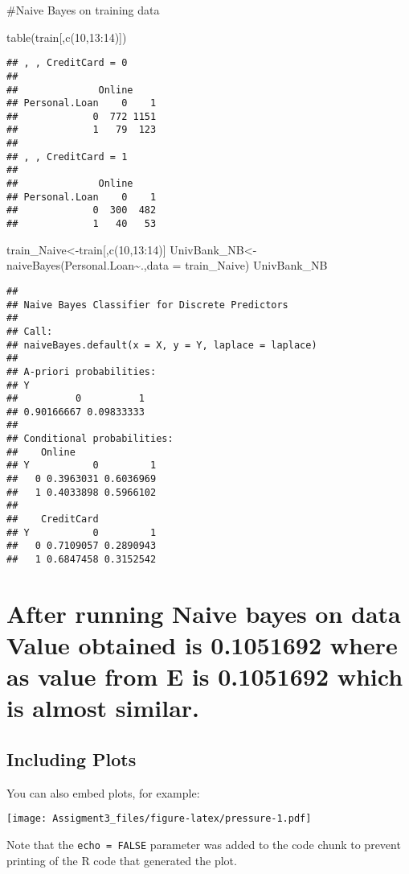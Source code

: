 \documentclass[
]{article}
\newenvironment{Shaded}{\begin{snugshade}}{\end{snugshade}}
\newcommand{\AttributeTok}[1]{\textcolor[rgb]{0.77,0.63,0.00}{#1}}
\newcommand{\DecValTok}[1]{\textcolor[rgb]{0.00,0.00,0.81}{#1}}
\newcommand{\FunctionTok}[1]{\textcolor[rgb]{0.00,0.00,0.00}{#1}}
\newcommand{\NormalTok}[1]{#1}
\newcommand{\OtherTok}[1]{\textcolor[rgb]{0.56,0.35,0.01}{#1}}
\newcommand{\SpecialCharTok}[1]{\textcolor[rgb]{0.00,0.00,0.00}{#1}}
\begin{document}
\#Naive Bayes on training data

\begin{Shaded}
\begin{Highlighting}[]
\FunctionTok{table}\NormalTok{(train[,}\FunctionTok{c}\NormalTok{(}\DecValTok{10}\NormalTok{,}\DecValTok{13}\SpecialCharTok{:}\DecValTok{14}\NormalTok{)])}
\end{Highlighting}
\end{Shaded}

\begin{verbatim}
## , , CreditCard = 0
## 
##              Online
## Personal.Loan    0    1
##             0  772 1151
##             1   79  123
## 
## , , CreditCard = 1
## 
##              Online
## Personal.Loan    0    1
##             0  300  482
##             1   40   53
\end{verbatim}

\begin{Shaded}
\begin{Highlighting}[]
\NormalTok{train\_Naive}\OtherTok{\textless{}{-}}\NormalTok{train[,}\FunctionTok{c}\NormalTok{(}\DecValTok{10}\NormalTok{,}\DecValTok{13}\SpecialCharTok{:}\DecValTok{14}\NormalTok{)]}
\NormalTok{UnivBank\_NB}\OtherTok{\textless{}{-}}\FunctionTok{naiveBayes}\NormalTok{(Personal.Loan}\SpecialCharTok{\textasciitilde{}}\NormalTok{.,}\AttributeTok{data =}\NormalTok{ train\_Naive)}
\NormalTok{UnivBank\_NB}
\end{Highlighting}
\end{Shaded}

\begin{verbatim}
## 
## Naive Bayes Classifier for Discrete Predictors
## 
## Call:
## naiveBayes.default(x = X, y = Y, laplace = laplace)
## 
## A-priori probabilities:
## Y
##          0          1 
## 0.90166667 0.09833333 
## 
## Conditional probabilities:
##    Online
## Y           0         1
##   0 0.3963031 0.6036969
##   1 0.4033898 0.5966102
## 
##    CreditCard
## Y           0         1
##   0 0.7109057 0.2890943
##   1 0.6847458 0.3152542
\end{verbatim}

\hypertarget{after-running-naive-bayes-on-data-value-obtained-is-0.1051692-where-as-value-from-e-is-0.1051692-which-is-almost-similar.}{%
\section{After running Naive bayes on data Value obtained is 0.1051692
where as value from E is 0.1051692 which is almost
similar.}\label{after-running-naive-bayes-on-data-value-obtained-is-0.1051692-where-as-value-from-e-is-0.1051692-which-is-almost-similar.}}

\hypertarget{including-plots}{%
\subsection{Including Plots}\label{including-plots}}

You can also embed plots, for example:

\texttt{[image: Assigment3\_files/figure-latex/pressure-1.pdf]}

Note that the \texttt{echo\ =\ FALSE} parameter was added to the code
chunk to prevent printing of the R code that generated the plot.
\end{document}
